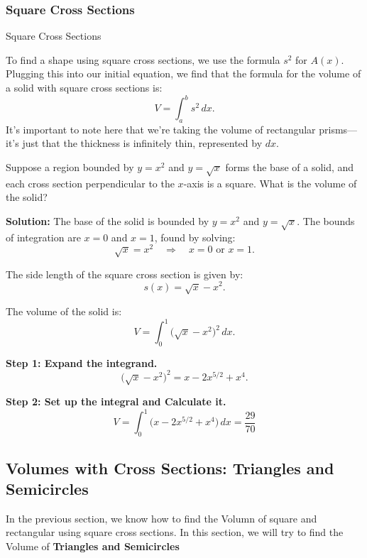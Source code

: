 \documentclass[12pt]{article}
\theoremstyle{beautifulthm}
\begin{document}
\newpage

\subsubsection{Square Cross Sections}
\begin{mytheorem}{Square Cross Sections}{}

To find a shape using square cross sections, we use the formula $s^2$ for $A(x)$. Plugging this into our initial equation, we find that the formula for the volume of a solid with square cross sections is:
\[
V = \int_a^b s^2 \, dx.
\]
It’s important to note here that we’re taking the volume of rectangular prisms—it’s just that the thickness is infinitely thin, represented by $dx$.
    
\end{mytheorem}

\begin{tcolorbox}[colback=examplebg, colframe=red!75!black, title=\textbf{EXAMPLE 2: Solids with Square Cross Sections}, fonttitle=\bfseries, sharp corners]

Suppose a region bounded by $y = x^2$ and $y = \sqrt{x}$ forms the base of a solid, and each cross section perpendicular to the $x$-axis is a square. What is the volume of the solid?

\tcblower
\textbf{Solution:} 
The base of the solid is bounded by $y = x^2$ and $y = \sqrt{x}$. The bounds of integration are $x = 0$ and $x = 1$, found by solving:
\[
\sqrt{x} = x^2 \quad \Rightarrow \quad x = 0 \text{ or } x = 1.
\]

The side length of the square cross section is given by:
\[
s(x) = \sqrt{x} - x^2.
\]

The volume of the solid is:
\[
V = \int_0^1 \big(\sqrt{x} - x^2\big)^2 \, dx.
\]

\textbf{Step 1: Expand the integrand.}
\[
\big(\sqrt{x} - x^2\big)^2 = x - 2x^{5/2} + x^4.
\]

\textbf{Step 2: Set up the integral and Calculate it.}
\[
V = \int_0^1 \big(x - 2x^{5/2} + x^4\big) \, dx  = \frac{29}{70}
\]
\end{tcolorbox}

\newpage
\subsection{Volumes with Cross
Sections: Triangles and
Semicircles}

In the previous section, we know how to find the Volumn of square and rectangular using square cross sections. In this section, we will try to find the Volume of \textbf{Triangles and Semicircles}
\end{document}
